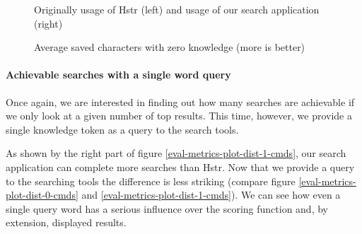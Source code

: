 \begin{figure}
\centering
{}\hfill
{}
\caption{Average saved characters with zero knowledge (more is better)}
\small{Originally usage of Hstr (left) and usage of our search application (right)}
\label{eval-metrics-plot-dist-0-chars}
\end{figure}


\newpage
\paragraph{Achievable searches with a single word query}

Once again, we are interested in finding out how many searches are achievable if we only look at a given number of top results. This time, however, we provide a single knowledge token as a query to the search tools.

As shown by the right part of figure \ref{eval-metrics-plot-dist-1-cmds}, our search application can complete more searches than Hstr. Now that we provide a query to the searching tools the difference is less striking (compare figure \ref{eval-metrics-plot-dist-0-cmds} and \ref{eval-metrics-plot-dist-1-cmds}). We can see how even a single query word has a serious influence over the scoring function and, by extension, displayed results. 

